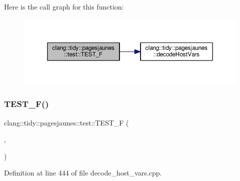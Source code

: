 Here is the call graph for this function\+:
\nopagebreak
\begin{figure}[H]
\begin{center}
\leavevmode
\includegraphics[width=350pt]{namespaceclang_1_1tidy_1_1pagesjaunes_1_1test_a46ed8bf461236effdb50a1b3fcdd9076_cgraph}
\end{center}
\end{figure}
\mbox{\label{namespaceclang_1_1tidy_1_1pagesjaunes_1_1test_a33236157fda3ec5efa2bd2519a725255}} 
\subsubsection{\texorpdfstring{T\+E\+S\+T\+\_\+\+F()}{TEST\_F()}\hspace{0.1cm}{\footnotesize\ttfamily [54/57]}}
{\footnotesize\ttfamily clang\+::tidy\+::pagesjaunes\+::test\+::\+T\+E\+S\+T\+\_\+F (\begin{DoxyParamCaption}\item[{\hyperlink{classclang_1_1tidy_1_1pagesjaunes_1_1test_1_1_decode_host_vars_test}{Decode\+Host\+Vars\+Test}}]{,  }\item[{Decode\+Host\+Vars\+Struct\+With\+Indicators}]{ }\end{DoxyParamCaption})}



Definition at line 444 of file decode\+\_\+host\+\_\+vars.\+cpp.

